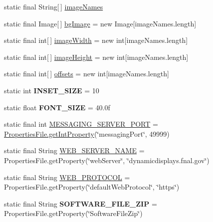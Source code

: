 \begin{DoxyCompactItemize}
\item 
static final String\mbox{[}$\,$\mbox{]} \hyperlink{classgov_1_1fnal_1_1ppd_1_1dd_1_1GlobalVariables_a356be5e37e706b201f6bc26130b73ce3}{image\-Names}
\item 
static final Image\mbox{[}$\,$\mbox{]} \hyperlink{classgov_1_1fnal_1_1ppd_1_1dd_1_1GlobalVariables_a912d45efb46176a8ccd9ce8e046695b0}{bg\-Image} = new Image\mbox{[}image\-Names.\-length\mbox{]}
\item 
static final int\mbox{[}$\,$\mbox{]} \hyperlink{classgov_1_1fnal_1_1ppd_1_1dd_1_1GlobalVariables_a88625f4c1de90b1b1bb20c05fd993617}{image\-Width} = new int\mbox{[}image\-Names.\-length\mbox{]}
\item 
static final int\mbox{[}$\,$\mbox{]} \hyperlink{classgov_1_1fnal_1_1ppd_1_1dd_1_1GlobalVariables_a4c27cf0455687a5f58b71ae0d20fd671}{image\-Height} = new int\mbox{[}image\-Names.\-length\mbox{]}
\item 
static final int\mbox{[}$\,$\mbox{]} \hyperlink{classgov_1_1fnal_1_1ppd_1_1dd_1_1GlobalVariables_aa46c72aaa61e4f90401679376f6071f5}{offsets} = new int\mbox{[}image\-Names.\-length\mbox{]}
\item 
\hypertarget{classgov_1_1fnal_1_1ppd_1_1dd_1_1GlobalVariables_a938952f27836544cbcf8eed0fceecb99}{static int {\bfseries I\-N\-S\-E\-T\-\_\-\-S\-I\-Z\-E} = 10}\label{classgov_1_1fnal_1_1ppd_1_1dd_1_1GlobalVariables_a938952f27836544cbcf8eed0fceecb99}

\item 
\hypertarget{classgov_1_1fnal_1_1ppd_1_1dd_1_1GlobalVariables_a9331af89f789ea1b54581c0198f7a43d}{static float {\bfseries F\-O\-N\-T\-\_\-\-S\-I\-Z\-E} = 40.\-0f}\label{classgov_1_1fnal_1_1ppd_1_1dd_1_1GlobalVariables_a9331af89f789ea1b54581c0198f7a43d}

\item 
static final int \hyperlink{classgov_1_1fnal_1_1ppd_1_1dd_1_1GlobalVariables_a3afb8f4fd1dbbc82329ea9ff4aa3629e}{M\-E\-S\-S\-A\-G\-I\-N\-G\-\_\-\-S\-E\-R\-V\-E\-R\-\_\-\-P\-O\-R\-T} = \hyperlink{classgov_1_1fnal_1_1ppd_1_1dd_1_1util_1_1PropertiesFile_a7c94841a2b3e49c8c26bc8a45ce7e1f6}{Properties\-File.\-get\-Int\-Property}(\char`\"{}messaging\-Port\char`\"{}, 49999)
\item 
static final String \hyperlink{classgov_1_1fnal_1_1ppd_1_1dd_1_1GlobalVariables_af5ffb15826513fabba402ec017edbc70}{W\-E\-B\-\_\-\-S\-E\-R\-V\-E\-R\-\_\-\-N\-A\-M\-E} = Properties\-File.\-get\-Property(\char`\"{}web\-Server\char`\"{}, \char`\"{}dynamicdisplays.\-fnal.\-gov\char`\"{})
\item 
static final String \hyperlink{classgov_1_1fnal_1_1ppd_1_1dd_1_1GlobalVariables_aa3bf05d555f0c3489c60664ae54a2480}{W\-E\-B\-\_\-\-P\-R\-O\-T\-O\-C\-O\-L} = Properties\-File.\-get\-Property(\char`\"{}default\-Web\-Protocol\char`\"{}, \char`\"{}https\char`\"{})
\item 
\hypertarget{classgov_1_1fnal_1_1ppd_1_1dd_1_1GlobalVariables_ab8e56e6480b2c30248d2e20aee782cb4}{static final String {\bfseries S\-O\-F\-T\-W\-A\-R\-E\-\_\-\-F\-I\-L\-E\-\_\-\-Z\-I\-P} = Properties\-File.\-get\-Property(\char`\"{}Software\-File\-Zip\char`\"{})}\label{classgov_1_1fnal_1_1ppd_1_1dd_1_1GlobalVariables_ab8e56e6480b2c30248d2e20aee782cb4}


\end{DoxyCompactItemize}
